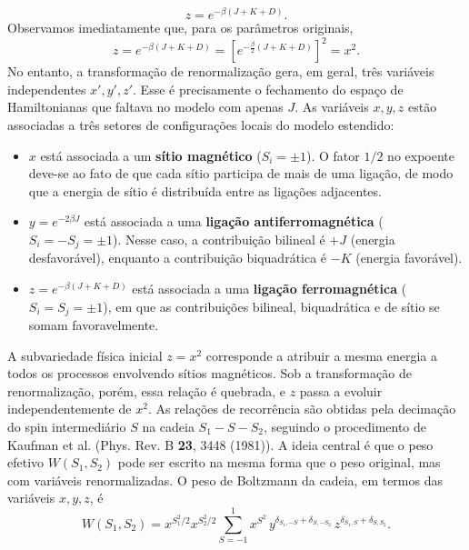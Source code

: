 \documentclass[12pt,a4paper]{article}
\begin{document}
%
\begin{equation}
    z=e^{-\beta(J+K+D)}.
    \label{eq:z_spin1}
\end{equation}
%
Observamos imediatamente que, para os parâmetros originais,
%
\begin{equation}
    z
    =
    e^{-\beta(J+K+D)}
    =
    \left[
        e^{-\frac{\beta}{2}(J+K+D)}
    \right]^2
    =
    x^2.
    \label{eq:z_x2_initial}
\end{equation}
%
No entanto, a transformação de renormalização gera, em geral, três
variáveis independentes \(x',y',z'\). Esse é precisamente o fechamento
do espaço de Hamiltonianas que faltava no modelo com apenas \(J\). As variáveis \(x,y,z\) estão associadas a três setores de
configurações locais do modelo estendido:
%
\begin{itemize}
    \item \(x\) está associada a um \textbf{sítio magnético}
    (\(S_i=\pm1\)). O fator \(1/2\) no expoente deve-se ao fato de
    que cada sítio participa de mais de uma ligação, de modo que a
    energia de sítio é distribuída entre as ligações adjacentes.

    \item \(y=e^{-2\beta J}\) está associada a uma \textbf{ligação
    antiferromagnética} (\(S_i=-S_j=\pm1\)). Nesse caso, a
    contribuição bilineal é \(+J\) (energia desfavorável), enquanto
    a contribuição biquadrática é \(-K\) (energia favorável).

    \item \(z=e^{-\beta(J+K+D)}\) está associada a uma \textbf{ligação
    ferromagnética} (\(S_i=S_j=\pm1\)), em que as contribuições
    bilineal, biquadrática e de sítio se somam favoravelmente.
\end{itemize}
%
A subvariedade física inicial \(z=x^2\) corresponde a atribuir a
mesma energia a todos os processos envolvendo sítios magnéticos. Sob a transformação de renormalização, porém, essa relação é quebrada,
e \(z\) passa a evoluir independentemente de \(x^2\). As relações de recorrência são obtidas pela decimação do spin
intermediário \(S\) na cadeia \(S_1-S-S_2\), seguindo o procedimento
de Kaufman et al. (Phys. Rev. B \textbf{23}, 3448 (1981)). A ideia
central é que o peso efetivo \(W(S_1,S_2)\) pode ser escrito na mesma
forma que o peso original, mas com variáveis renormalizadas. O peso de Boltzmann da cadeia, em termos das variáveis \(x,y,z\), é
%
\begin{equation}
    W(S_1,S_2)
    =
    x^{S_1^2/2}
    x^{S_2^2/2}
    \sum_{S=-1}^{1}
    x^{S^2}\,
    y^{\delta_{S_1,-S}+\delta_{S,-S_2}}\,
    z^{\delta_{S_1,S}+\delta_{S,S_2}}.
    \label{eq:W_chain_general_p4}
\end{equation}
\end{document}
